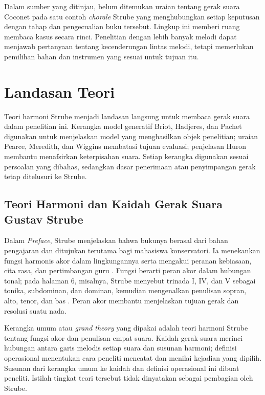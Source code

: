 Dalam sumber yang ditinjau, belum ditemukan uraian tentang gerak suara Coconet pada satu contoh \textit{chorale} Strube yang menghubungkan setiap keputusan dengan tahap dan pengecualian buku tersebut. Lingkup ini memberi ruang membaca kasus secara rinci. Penelitian dengan lebih banyak melodi dapat menjawab pertanyaan tentang kecenderungan lintas melodi, tetapi memerlukan pemilihan bahan dan instrumen yang sesuai untuk tujuan itu.

\section{Landasan Teori}\label{sec:landasan-teori}

Teori harmoni Strube menjadi landasan langsung untuk membaca gerak suara dalam penelitian ini. Kerangka model generatif Briot, Hadjeres, dan Pachet digunakan untuk menjelaskan model yang menghasilkan objek penelitian; uraian Pearce, Meredith, dan Wiggins membatasi tujuan evaluasi; penjelasan Huron membantu menafsirkan keterpisahan suara. Setiap kerangka digunakan sesuai persoalan yang dibahas, sedangkan dasar penerimaan atau penyimpangan gerak tetap ditelusuri ke Strube.

\subsection{Teori Harmoni dan Kaidah Gerak Suara Gustav Strube}\label{sec:teori-harmoni-dan-kaidah-strube}

Dalam \textit{Preface}, Strube menjelaskan bahwa bukunya berasal dari bahan pengajaran dan ditujukan terutama bagi mahasiswa konservatori. Ia menekankan fungsi harmonis akor dalam lingkungannya serta mengakui peranan kebiasaan, cita rasa, dan pertimbangan guru \parencite[Preface]{strube1928}. Fungsi berarti peran akor dalam hubungan tonal; pada halaman 6, misalnya, Strube menyebut trinada I, IV, dan V sebagai tonika, subdominan, dan dominan, kemudian mengenalkan penulisan sopran, alto, tenor, dan bas \parencite[6]{strube1928}. Peran akor membantu menjelaskan tujuan gerak dan resolusi suatu nada.

Kerangka umum atau \textit{grand theory} yang dipakai adalah teori harmoni Strube tentang fungsi akor dan penulisan empat suara. Kaidah gerak suara merinci hubungan antara garis melodis setiap suara dan susunan harmoni; definisi operasional menentukan cara peneliti mencatat dan menilai kejadian yang dipilih. Susunan dari kerangka umum ke kaidah dan definisi operasional ini dibuat peneliti. Istilah tingkat teori tersebut tidak dinyatakan sebagai pembagian oleh Strube.


